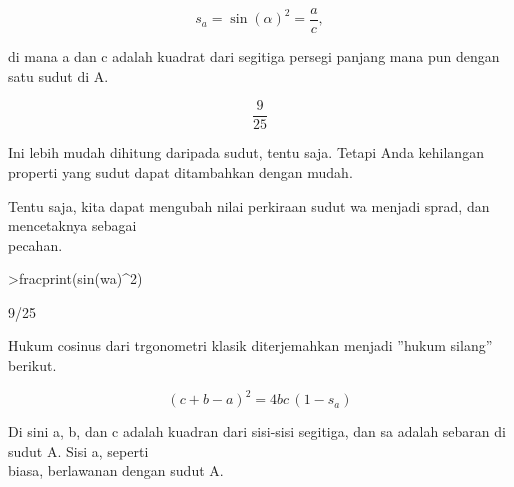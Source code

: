 \documentclass[12pt,arial,letterpaper]{book}
\begin{document}
\begin{eulernootebook}
\begin{eulercomment}
\begin{eulercomment}
\begin{eulernootebook}
\begin{eulercomment}
\begin{eulercomment}
\begin{eulercomment}
\begin{eulercomment}
\begin{eulercomment}
\begin{eulercomment}
\begin{eulernotebook}
\begin{eulercomment}
\begin{eulercomment}
\begin{eulercomment}
\begin{eulercomment}
\begin{eulercomment}
\end{eulercomment}
\begin{eulerformula}
\[
s_a = \sin(\alpha)^2 = \frac{a}{c},
\]
\end{eulerformula}
\begin{eulercomment}
di mana a dan c adalah kuadrat dari segitiga persegi panjang mana pun
dengan satu sudut di A.
\end{eulercomment}
\begin{eulerformula}
\[
\frac{9}{25}
\]
\end{eulerformula}
\begin{eulercomment}
Ini lebih mudah dihitung daripada sudut, tentu saja. Tetapi Anda
kehilangan properti yang sudut dapat ditambahkan dengan mudah.

Tentu saja, kita dapat mengubah nilai perkiraan sudut wa menjadi
sprad, dan mencetaknya sebagai\\
pecahan.
\end{eulercomment}
\begin{eulerprompt}
>fracprint(sin(wa)^2)
\end{eulerprompt}
\begin{euleroutput}
  9/25
\end{euleroutput}
\begin{eulercomment}
Hukum cosinus dari trgonometri klasik diterjemahkan menjadi ”hukum
silang” berikut.

\end{eulercomment}
\begin{eulerformula}
\[
(c+b-a)^2 = 4 b c \, (1-s_a)
\]
\end{eulerformula}
\begin{eulercomment}
Di sini a, b, dan c adalah kuadran dari sisi-sisi segitiga, dan sa
adalah sebaran di sudut A. Sisi a, seperti\\
biasa, berlawanan dengan sudut A.


\end{eulercomment}
\end{eulercomment}
\end{eulercomment}
\end{eulercomment}
\end{eulercomment}
\end{eulernotebook}
\end{eulercomment}
\end{eulercomment}
\end{eulercomment}
\end{eulercomment}
\end{eulercomment}
\end{eulercomment}
\end{eulernootebook}
\end{eulercomment}
\end{eulercomment}
\end{eulernootebook}
\end{document}
